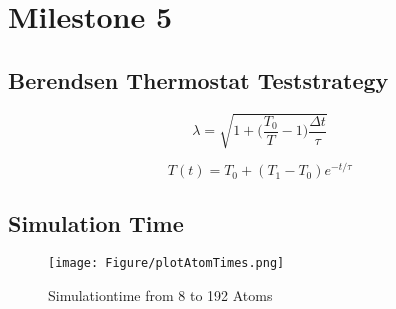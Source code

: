 \chapter{Milestone 5}
\section{Berendsen Thermostat Teststrategy}
\begin{comment}
-basic idea is weather or not the implementation follows the exponential damping from the 2 equation for a small system with known velocities
\end{comment}
\begin{equation}
	\lambda = \sqrt{1 + \bigg(\frac{T_{0}}{T} -1\bigg)\frac{\Delta t}{\tau}}
\end{equation}

\begin{equation}
	T(t) = T_{0} + (T_{1}-T_{0})e^{-t/\tau}
\end{equation}

\section{Simulation Time}
\begin{comment}
simulation should be roughly of complexity N2
may need too approximate with a function 
\end{comment}
\begin{figure}[!h]
	\begin{center}
		\texttt{[image: Figure/plotAtomTimes.png]}
	\end{center}
	\caption[Simulationtime]{Simulationtime from 8 to 192 Atoms }
	\label{PlotAtomTimes}
\end{figure}


